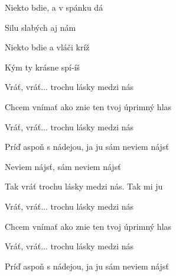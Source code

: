 \begin{song}
\bigskip

Niekto bdie, a v spánku dá \par
{} Silu slabých aj nám \par
{} Niekto bdie a vláči kríž \par
{} Kým ty krásne spí-íš \par

\bigskip

Vráť, vráť... trochu lásky medzi nás  \par
{} Chcem vnímať ako znie ten tvoj úprimný hlas  \par
{}Vráť, vráť... trochu lásky medzi nás  \par
{} Príď aspoň s nádejou, ja ju sám neviem nájsť  \par

\bigskip

Neviem nájsť, sám neviem nájsť   \par
Tak vráť trochu lásky medzi nás.  Tak mi ju \par

\bigskip


Vráť, vráť... trochu lásky medzi nás  \par
{} Chcem vnímať ako znie ten tvoj úprimný hlas  \par
{}Vráť, vráť... trochu lásky medzi nás  \par
{} Príď aspoň s nádejou, ja ju sám neviem nájsť  \par
{} \par

\end{song}
